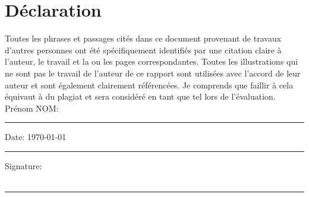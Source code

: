 

\section*{\Large Déclaration}

Toutes les phrases et passages cités dans ce document provenant de travaux d'autres personnes ont été spécifiquement identifiés par une citation claire à l'auteur, le travail et la ou les pages correspondantes.
Toutes les illustrations qui ne sont pas le travail de l'auteur de ce rapport sont utilisées avec l'accord de leur auteur et sont également clairement référencées. Je comprends que faillir à cela équivaut à du plagiat et sera considéré en tant que tel lors de l'évaluation.\\[1cm]

\noindent Prénom NOM: \\[1mm]
\rule[1em]{25em}{0.5pt}

\noindent Date: \today \\[1mm]
\rule[1em]{25em}{0.5pt}

\noindent Signature:\\[1mm]
\\
\rule[1em]{25em}{0.5pt}